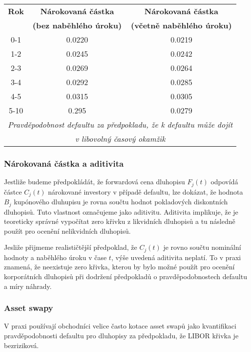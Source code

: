 \documentclass[a4paper]{book}
\begin{document}
\begin{center}
\begin{tabular}{c c c}
\textbf{Rok} &
\textbf{Nárokovaná částka} &
\textbf{Nárokovaná částka}\\
\textbf{} &
\textbf{(bez naběhlého úroku)} &
\textbf{(včetně naběhlého úroku)}\\
\hline
0-1  & 0.0220 & 0.0219\\
1-2  & 0.0245 & 0.0242\\
2-3  & 0.0269 & 0.0264\\
3-4  & 0.0292 & 0.0285\\
4-5  & 0.0315 & 0.0305\\
5-10 & 0.295 & 0.0279\\
\hline
\multicolumn{3}{c}{\footnotesize{\textit{Pravděpodobnost defaultu za předpokladu, že k defaultu může dojít}}} \\
\multicolumn{3}{c}{\footnotesize{\textit{v libovolný časový okamžik}}} \\
\end{tabular}
\end{center}

\subsubsection{Nárokovaná částka a aditivita}

Jestliže budeme předpokládát, že forwardová cena dluhopisu $F_j(t)$ odpovídá částce $C_j(t)$ nárokované investory v případě defaultu, lze dokázat, že hodnota $B_j$ kupónového dluhupisu je rovna součtu hodnot pokladových diskontních dluhopisů. Tuto vlastnost označujeme jako aditivitu. Aditivita implikuje, že je teoreticky správné vypočítat zero křivku z likvidních dluhopisů a tu následně použít pro ocenění nelikvidních dluhopisů.

Jesliže přijmeme realističtější předpoklad, že $C_j(t)$ je rovno součtu nominální hodnoty a naběhlého úroku v čase $t$, výše uvedená aditivita neplatí. To v praxi znamená, že neexistuje zero křivka, kterou by bylo možné použít pro ocenění korporátních dluhopisů při dodržení předpokladů o pravděpodobnostech defaultu a míry náhrady.

\subsubsection{Asset swapy}

V praxi používají obchodníci velice často kotace asset swapů jako kvantifikaci pravděpodobnosti defaultu pro dluhopisy za předpokladu, že LIBOR křivka je bezriziková.
\end{document}

